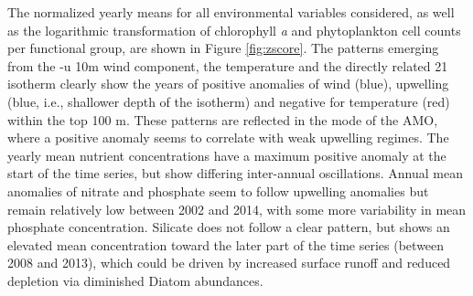 \documentclass[draft]{agujournal2019}
\begin{document}
The normalized yearly means for all environmental variables considered, as well as the logarithmic transformation of chlorophyll \textit{a} and phytoplankton cell counts per functional group, are shown in Figure \ref{fig:zscore}. The patterns emerging from the -u 10m wind component, the temperature and the directly related \qty{21}{\celcius} isotherm clearly show the years of positive anomalies of wind (blue), upwelling (blue, i.e., shallower depth of the isotherm) and negative for temperature (red) within the top 100 m. These patterns are reflected in the mode of the AMO, where a positive anomaly seems to correlate with weak upwelling regimes. The yearly mean nutrient concentrations have a maximum positive anomaly at the start of the time series, but show differing inter-annual oscillations. Annual mean anomalies of nitrate and phosphate seem to follow upwelling anomalies but remain relatively low between 2002 and 2014, with some more variability in mean phosphate concentration. Silicate does not follow a clear pattern, but shows an elevated mean concentration toward the later part of the time series (between 2008 and 2013), which could be driven by increased surface runoff \cite{lorenzoni_characterization_2015} and reduced depletion via diminished Diatom abundances. 
\end{document}
